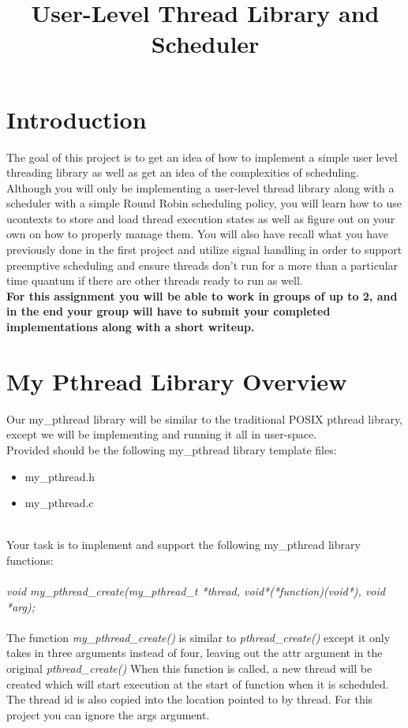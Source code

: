 \documentclass{article}
\title{\textbf{User-Level Thread Library and Scheduler}} %
\date{} %
\begin{document}
\maketitle %

\section*{Introduction}
The goal of this project is to get an idea of how to implement a simple user level threading library as well as get an idea of the complexities of scheduling. Although you will only be implementing a user-level thread library along with a scheduler with a simple Round Robin scheduling policy, you will learn how to use ucontexts to store and load thread execution states as well as figure out on your own on how to properly manage them. You will also have recall what you have previously done in the first project and utilize signal handling in order to support preemptive scheduling and ensure threads don’t run for a more than a particular time quantum if there are other threads ready to run as well.\\

\noindent \textbf{For this assignment you will be able to work in groups of up to 2, and in the end your group will have to submit your completed implementations along with a short writeup.}


\section*{My Pthread Library Overview}
Our my\_pthread library will be similar to the traditional POSIX pthread library, except we will be implementing and running it all in user-space.\\

\noindent Provided should be the following my\_pthread library template files:
\begin{itemize}
\item my\_pthread.h
\item my\_pthread.c
\end{itemize}

\-\ \\ \noindent Your task is to implement and support the following my\_pthread library functions:\\\\

\noindent \textit{void my\_pthread\_create(my\_pthread\_t *thread, void*(*function)(void*), void *arg);}\\\\
\noindent The function \textit{my\_pthread\_create()} is similar to \textit{pthread\_create()} except it only takes in three arguments instead of four, leaving out the attr argument in the original \textit{pthread\_create()} When this function is called, a new thread will be created which will start execution at the start of function when it is scheduled. The thread id is also copied into the location pointed to by thread. For this project you can ignore the args argument.\\\\
\end{document}
